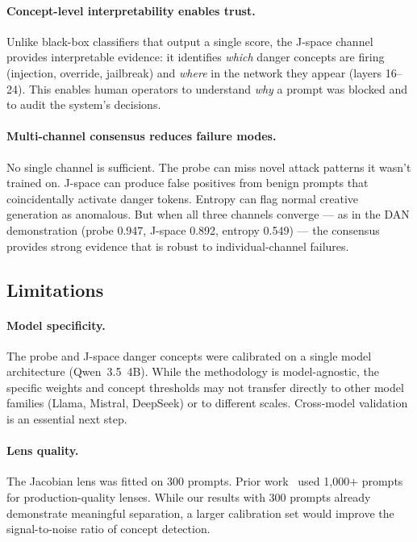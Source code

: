 \documentclass[11pt]{article}
\begin{document}
\paragraph{Concept-level interpretability enables trust.}
Unlike black-box classifiers that output a single score, the J-space channel provides interpretable evidence: it identifies \textit{which} danger concepts are firing (injection, override, jailbreak) and \textit{where} in the network they appear (layers 16--24). This enables human operators to understand \textit{why} a prompt was blocked and to audit the system's decisions.

\paragraph{Multi-channel consensus reduces failure modes.}
No single channel is sufficient. The probe can miss novel attack patterns it wasn't trained on. J-space can produce false positives from benign prompts that coincidentally activate danger tokens. Entropy can flag normal creative generation as anomalous. But when all three channels converge — as in the DAN demonstration (probe 0.947, J-space 0.892, entropy 0.549) — the consensus provides strong evidence that is robust to individual-channel failures.

\subsection{Limitations}

\paragraph{Model specificity.}
The probe and J-space danger concepts were calibrated on a single model architecture (Qwen~3.5~4B). While the methodology is model-agnostic, the specific weights and concept thresholds may not transfer directly to other model families (Llama, Mistral, DeepSeek) or to different scales. Cross-model validation is an essential next step.

\paragraph{Lens quality.}
The Jacobian lens was fitted on 300 prompts. Prior work~\cite{anthropic2026workspace} used 1,000+ prompts for production-quality lenses. While our results with 300 prompts already demonstrate meaningful separation, a larger calibration set would improve the signal-to-noise ratio of concept detection.
\end{document}
